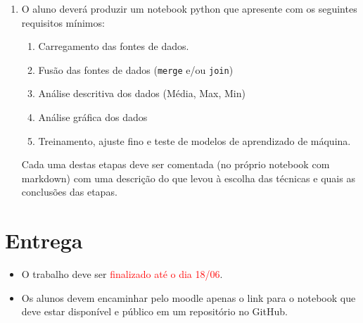 \documentclass{article}
\begin{document}
\begin{enumerate}
    \item  O aluno deverá produzir um notebook python que apresente com os seguintes requisitos mínimos: 
    \begin{enumerate}
        \item Carregamento das fontes de dados.
        \item Fusão das fontes de dados (\texttt{merge} e/ou \texttt{join})
        \item Análise descritiva dos dados (Média, Max, Min)
        \item Análise gráfica dos dados
        \item Treinamento, ajuste fino e teste de modelos de aprendizado de máquina. 
    \end{enumerate}
    Cada uma destas etapas deve ser comentada (no próprio notebook com markdown) com uma descrição do que levou à escolha das técnicas e quais as conclusões das etapas.
\end{enumerate}

\section{Entrega}

\begin{itemize}
    \item O trabalho deve ser \textcolor{red}{finalizado até o dia 18/06}. 
    \item Os alunos devem encaminhar pelo moodle apenas o link para o notebook que deve estar disponível e público em um repositório no GitHub.
\end{itemize}
 



%
%
\end{document}
